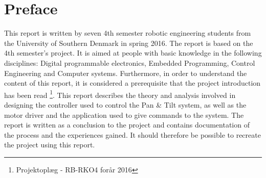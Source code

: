 \section*{Preface}

This report is written by seven 4th semester robotic engineering students from the University of Southern Denmark in spring 2016. The report is based on the 4th semester's project.
It is aimed at people with basic knowledge in the following disciplines: Digital programmable electronics, Embedded Programming, Control Engineering and Computer systems. Furthermore, in order to understand the content of this report, it is considered a prerequisite that the project introduction has been read \footnote{Projektoplæg - RB-RKO4 forår 2016}.
This report describes the theory and analysis involved in designing the controller used to control the Pan \& Tilt system, as well as the motor driver and the application used to give commands to the system.
The report is written as a conclusion to the project and contains documentation of the process and the experiences gained. It should therefore be possible to recreate the project using this report.